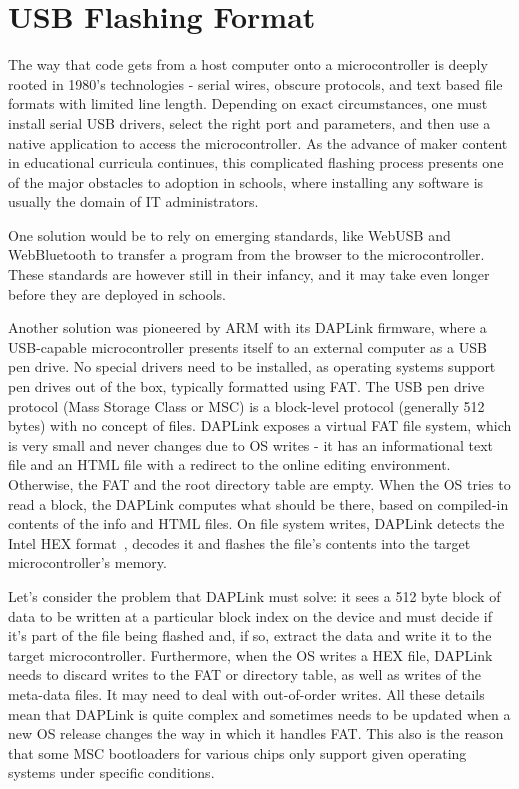 \section{USB Flashing Format}
\label{sec:uf2}

The way that code gets from a host computer onto a microcontroller is deeply rooted in 1980's technologies - 
serial wires, obscure protocols, and text based file formats with limited line length. Depending on exact circumstances,
one must install serial USB drivers, select the right port and parameters, and then use a native application to access
the microcontroller. As the advance of maker content in educational curricula continues,
this complicated flashing process presents one of the major obstacles to adoption in schools, 
where installing any software is usually the domain of IT administrators.

One solution would be to rely on emerging standards, like WebUSB and WebBluetooth to transfer a program from the browser 
to the microcontroller. These standards are however still in their infancy, and it may take even longer before they are 
deployed in schools.

Another solution was pioneered by ARM with its DAPLink firmware, where a USB-capable microcontroller presents itself 
to an external computer as a USB pen drive. No special drivers need to be installed, as operating systems support pen
drives out of the box, typically formatted using FAT. The USB pen drive protocol (Mass Storage Class or MSC) is a
block-level protocol (generally 512 bytes) with no concept of files. DAPLink exposes a virtual FAT file system, which
is very small and never changes due to OS writes - it has an informational text file and an HTML file with a redirect
to the online editing environment. Otherwise, the FAT and the root directory table are empty. When the OS tries to
read a block, the DAPLink computes what should be there, based on compiled-in contents of the info and HTML files.
On file system writes, DAPLink detects the Intel HEX format~\cite{IntelHEX}, 
decodes it and flashes the file's contents into the target microcontroller's memory. 

Let's consider the problem that DAPLink must solve: it sees a 512 byte block of data to be written
at a particular block index on the device and must decide if it's part of the file being flashed and, if so, extract
the data and write it to the target microcontroller. Furthermore, when the OS writes a HEX file, DAPLink needs to discard
writes to the FAT or directory table, as well as writes of the meta-data files. It may need to deal with out-of-order writes.
All these details mean that DAPLink is quite complex and sometimes needs to be updated when a new OS release changes the way
in which it handles FAT. This also is the reason that some MSC bootloaders for various chips only support given operating
systems under specific conditions.

